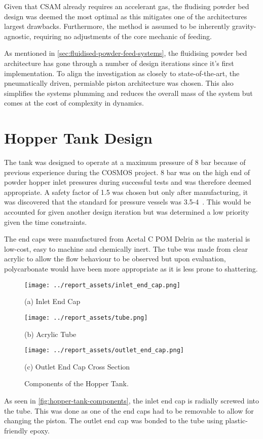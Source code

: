 Given that CSAM already requires an accelerant gas, the fludising powder bed design was deemed the most optimal as this mitigates one of the architectures largest drawbacks. Furthermore, the method is assumed to be inherently gravity-agnostic, requiring no adjustments of the core mechanic of feeding. 

As mentioned in \autoref{sec:fluidised-powder-feed-systems}, the fluidising powder bed architecture has gone through a number of design iterations since it's first implementation. To align the investigation as closely to state-of-the-art, the pneumatically driven, permiable piston architecture was chosen. This also simplifies the systems plumming and reduces the overall mass of the system but comes at the cost of complexity in dynamics.
\newpage
\section{Hopper Tank Design}
The tank was designed to operate at a maximum pressure of 8 bar because of previous experience during the COSMOS project. 8 bar was on the high end of powder hopper inlet pressures during successful tests and was therefore deemed appropriate. A safety factor of 1.5 was chosen but only after manufacturing, it was discovered that the standard for pressure vessels was 3.5-4~\cite{redriver2024asme}. This would be accounted for given another design iteration but was determined a low priority given the time constraints.

The end caps were manufactured from Acetal C POM Delrin as the material is low-cost, easy to machine and chemically inert. The tube was made from clear acrylic to allow the flow behaviour to be observed but upon evaluation, polycarbonate would have been more appropriate as it is less prone to shattering.
\begin{figure}[htbp]
    \centering

    \begin{minipage}{0.3\textwidth}
        \centering
        \texttt{[image: ../report\_assets/inlet\_end\_cap.png]}
        \caption*{(a) Inlet End Cap}
    \end{minipage}
    \hfill
    \begin{minipage}{0.3\textwidth}
        \centering
        \texttt{[image: ../report\_assets/tube.png]}
        \caption*{(b) Acrylic Tube}
    \end{minipage}
    \hfill
    \begin{minipage}{0.3\textwidth}
        \centering
        \texttt{[image: ../report\_assets/outlet\_end\_cap.png]}
        \caption*{(c) Outlet End Cap Cross Section}
    \end{minipage}
    \caption{Components of the Hopper Tank.}\label{fig:hopper-tank-components}
\end{figure}
As seen in \autoref{fig:hopper-tank-components}, the inlet end cap is radially screwed into the tube. This was done as one of the end caps had to be removable to allow for changing the piston. The outlet end cap was bonded to the tube using plastic-friendly epoxy.

